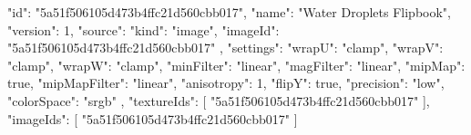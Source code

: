 {
  "id": "5a51f506105d473b4ffc21d560cbb017",
  "name": "Water Droplets Flipbook",
  "version": 1,
  "source": {
    "kind": "image",
    "imageId": "5a51f506105d473b4ffc21d560cbb017"
  },
  "settings": {
    "wrapU": "clamp",
    "wrapV": "clamp",
    "wrapW": "clamp",
    "minFilter": "linear",
    "magFilter": "linear",
    "mipMap": true,
    "mipMapFilter": "linear",
    "anisotropy": 1,
    "flipY": true,
    "precision": "low",
    "colorSpace": "srgb"
  },
  "textureIds": [
    "5a51f506105d473b4ffc21d560cbb017"
  ],
  "imageIds": [
    "5a51f506105d473b4ffc21d560cbb017"
  ]
}
